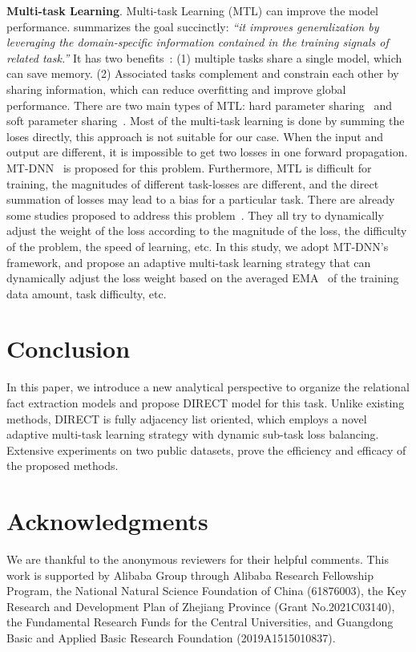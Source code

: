 \documentclass[11pt,a4paper]{article}
\begin{document}
\textbf{Multi-task Learning}. Multi-task Learning (MTL) can improve the model performance. \cite{caruana1997multitask} summarizes the goal succinctly: \textit{``it improves generalization by leveraging the domain-specific information contained in the training signals of related task.''} It has two benefits~\cite{vandenhende2020multi}: (1) multiple tasks share a single model, which can save memory. (2) Associated tasks complement and constrain each other by sharing information, which can reduce overfitting and improve global performance. There are two main types of MTL: hard parameter sharing~\cite{baxter1997bayesian} and soft parameter sharing~\cite{duong2015low}. Most of the multi-task learning is done by summing the loses directly, this approach is not suitable 
for our case. When the input and output are different, it is impossible to get two losses in one forward propagation. MT-DNN~\cite{liu2019multi} is proposed for this problem. Furthermore, MTL is difficult for training, the magnitudes of different task-losses are different, and the direct summation of losses may lead to a bias for a particular task. There are already some studies proposed to address this problem~\cite{chen2018gradnorm,guo2018dynamic,liu2019end}. They all try to dynamically adjust the weight of the loss according to the magnitude of the loss, the difficulty of the problem, the speed of learning, etc. In this study, we adopt MT-DNN's framework, and propose an adaptive multi-task learning strategy that can dynamically adjust the loss weight based on the averaged EMA~\cite{lawrance1977exponential} of the training data amount, task difficulty, etc.














 \section{Conclusion}
In this paper,  we introduce a new analytical perspective to organize the relational fact extraction models and propose DIRECT model for this task. Unlike existing methods, DIRECT is fully adjacency list oriented, which employs a novel adaptive multi-task learning strategy with dynamic sub-task loss balancing. Extensive experiments on two public datasets, prove the efficiency and efficacy of the proposed methods.
%
 
\section*{Acknowledgments}
We are thankful to the anonymous reviewers for their helpful comments. This work is supported by Alibaba Group through Alibaba Research Fellowship Program, the National Natural Science Foundation of China (61876003), the Key Research and Development Plan of Zhejiang Province (Grant No.2021C03140), the Fundamental Research Funds for the Central Universities, and Guangdong Basic and Applied Basic Research Foundation (2019A1515010837).
\end{document}
